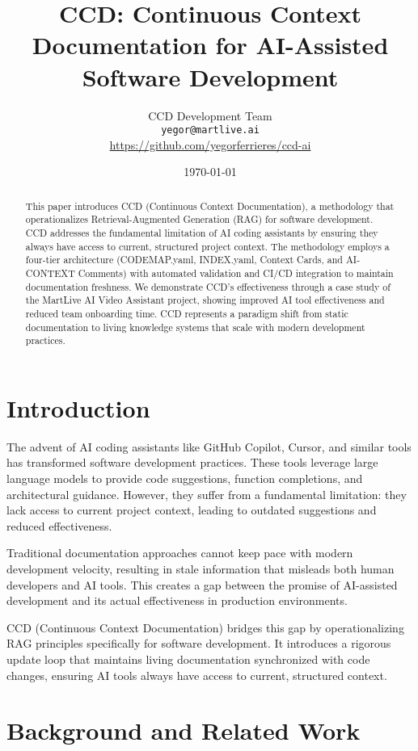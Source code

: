 \documentclass[11pt,a4paper]{article}
\title{CCD: Continuous Context Documentation for AI-Assisted Software Development}
\author{
    CCD Development Team \\
    \texttt{yegor@martlive.ai} \\
    \url{https://github.com/yegorferrieres/ccd-ai}
}
\date{\today}
\begin{document}
\maketitle

\begin{abstract}
This paper introduces CCD (Continuous Context Documentation), a methodology that operationalizes Retrieval-Augmented Generation (RAG) for software development. CCD addresses the fundamental limitation of AI coding assistants by ensuring they always have access to current, structured project context. The methodology employs a four-tier architecture (CODEMAP.yaml, INDEX.yaml, Context Cards, and AI-CONTEXT Comments) with automated validation and CI/CD integration to maintain documentation freshness. We demonstrate CCD's effectiveness through a case study of the MartLive AI Video Assistant project, showing improved AI tool effectiveness and reduced team onboarding time. CCD represents a paradigm shift from static documentation to living knowledge systems that scale with modern development practices.
\end{abstract}

\section{Introduction}

The advent of AI coding assistants like GitHub Copilot, Cursor, and similar tools has transformed software development practices. These tools leverage large language models to provide code suggestions, function completions, and architectural guidance. However, they suffer from a fundamental limitation: they lack access to current project context, leading to outdated suggestions and reduced effectiveness.

Traditional documentation approaches cannot keep pace with modern development velocity, resulting in stale information that misleads both human developers and AI tools. This creates a gap between the promise of AI-assisted development and its actual effectiveness in production environments.

CCD (Continuous Context Documentation) bridges this gap by operationalizing RAG principles specifically for software development. It introduces a rigorous update loop that maintains living documentation synchronized with code changes, ensuring AI tools always have access to current, structured context.

\section{Background and Related Work}
\end{document}
